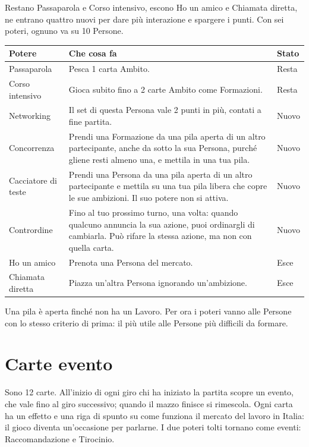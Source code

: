 \documentclass[11pt,a4paper]{article}
\begin{document}
Restano Passaparola e Corso intensivo, escono Ho un amico e Chiamata diretta, ne entrano quattro nuovi per dare
più interazione e spargere i punti. Con sei poteri, ognuno va su 10 Persone.

{\small
\begin{tabularx}{\textwidth}{@{}P{3.4cm}Lp{1.4cm}@{}}
\toprule
Potere & Che cosa fa & Stato \\
\midrule
Passaparola & Pesca 1 carta Ambito. & Resta \\
Corso intensivo & Gioca subito fino a 2 carte Ambito come Formazioni. & Resta \\
Networking & Il set di questa Persona vale 2 punti in più, contati a fine partita. & Nuovo \\
Concorrenza & Prendi una Formazione da una pila aperta di un altro partecipante, anche da sotto la sua Persona, purché gliene resti almeno una, e mettila in una tua pila. & Nuovo \\
Cacciatore di teste & Prendi una Persona da una pila aperta di un altro partecipante e mettila su una tua pila libera che copre le sue ambizioni. Il suo potere non si attiva. & Nuovo \\
Contrordine & Fino al tuo prossimo turno, una volta: quando qualcuno annuncia la sua azione, puoi ordinargli di cambiarla. Può rifare la stessa azione, ma non con quella carta. & Nuovo \\
Ho un amico & Prenota una Persona del mercato. & Esce \\
Chiamata diretta & Piazza un'altra Persona ignorando un'ambizione. & Esce \\
\bottomrule
\end{tabularx}
}

Una pila è aperta finché non ha un Lavoro. Per ora i poteri vanno alle Persone con lo stesso criterio di prima:
il più utile alle Persone più difficili da formare.

\section{Carte evento}

Sono 12 carte. All'inizio di ogni giro chi ha iniziato la partita scopre un evento, che vale fino al giro
successivo; quando il mazzo finisce si rimescola. Ogni carta ha un effetto e una riga di spunto su come funziona il
mercato del lavoro in Italia: il gioco diventa un'occasione per parlarne. I due poteri tolti tornano come eventi:
Raccomandazione e Tirocinio.
\end{document}
